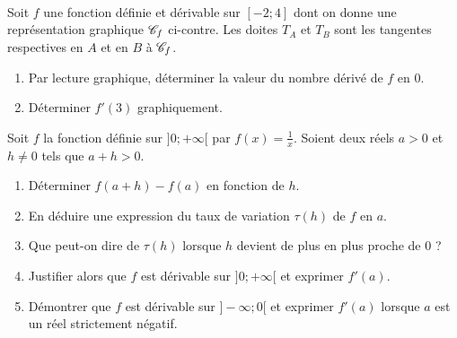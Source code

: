 \documentclass[11pt]{article}
\begin{document}
\begin{exo}~\\[-8mm]
\begin{minipage}{.5\textwidth}
  Soit $f$ une fonction définie et dérivable sur $[-2;4]$ dont on donne une
  représentation graphique $\mathscr{C}_f$ ci-contre. Les doites $T_A$ et $T_B$ sont les
  tangentes respectives en $A$ et en $B$ à $\mathscr{C}_f$.
  \begin{enumerate}
    \item Par lecture graphique, déterminer la valeur du nombre dérivé de $f$ en
      $0$.
    \item Déterminer $f'(3)$ graphiquement.
  \end{enumerate}
\end{minipage}
\begin{minipage}{.5\textwidth}
\begin{center}
\end{center}
\end{minipage}
\end{exo}

\begin{exo}
Soit $f$ la fonction définie sur $]0; +\infty[$ par
  $f(x)=\frac{1}{x}$. Soient deux réels $a>0$ et $h\neq0$ tels que $a+h>0$.
  \begin{enumerate}
    \item Déterminer $f(a+h)-f(a)$ en fonction de $h$.
    \item En déduire une expression du taux de variation $\tau(h)$ de $f$ en
      $a$.
    \item Que peut-on dire de $\tau(h)$ lorsque $h$ devient de plus en plus
      proche de $0$ ?
  \item Justifier alors que $f$ est dérivable sur $]0; +\infty[$ et exprimer
      $f'(a)$.
  \item Démontrer que $f$ est dérivable sur $]-\infty; 0[$ et exprimer $f'(a)$
      lorsque $a$ est un réel strictement négatif.
  \end{enumerate}
\end{exo}
\end{document}
